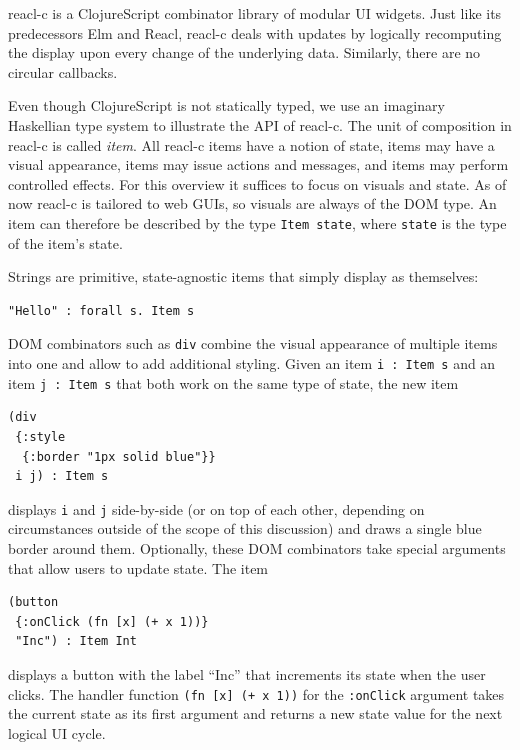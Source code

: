 \documentclass[sigplan,review,screen]{acmart}
\begin{document}
reacl-c is a ClojureScript combinator library of modular UI widgets.
Just like its predecessors Elm and Reacl, reacl-c deals with updates
by logically recomputing the display upon every change of the
underlying data. Similarly, there are no circular callbacks.

Even though ClojureScript is not statically typed, we use an imaginary
Haskellian type system to illustrate the API of reacl-c. The unit of
composition in reacl-c is called \textit{item}. All reacl-c items have
a notion of state, items may have a visual appearance, items may issue
actions and messages, and items may perform controlled effects.  For
this overview it suffices to focus on visuals and state. As of now
reacl-c is tailored to web GUIs, so visuals are always of the DOM
type. An item can therefore be described by the type \texttt{Item
  state}, where \texttt{state} is the type of the item's state.

Strings are primitive, state-agnostic items that simply display as
themselves:
%
\begin{verbatim}
"Hello" : forall s. Item s
\end{verbatim}
%

DOM combinators such as \texttt{div} combine the visual appearance of multiple items into
one and allow to add additional styling. Given an item \texttt{i :
  Item s} and an item \texttt{j : Item s} that both work on the same
type of state, the new item
%
\begin{verbatim}
(div
 {:style
  {:border "1px solid blue"}}
 i j) : Item s
\end{verbatim}
%
displays \texttt{i} and \texttt{j}
side-by-side (or on top of each other, depending on circumstances
outside of the scope of this discussion) and draws a single blue
border around them. Optionally, these DOM combinators take special
arguments that allow users to update state. The item
%
\begin{verbatim}
(button
 {:onClick (fn [x] (+ x 1))}
 "Inc") : Item Int
\end{verbatim}
%
displays a button with the label ``Inc'' that increments its state
when the user clicks. The handler function \texttt{(fn [x] (+ x 1))}
for the \texttt{:onClick} argument takes the current state as its
first argument and returns a new state value for the next logical UI
cycle.
\end{document}
